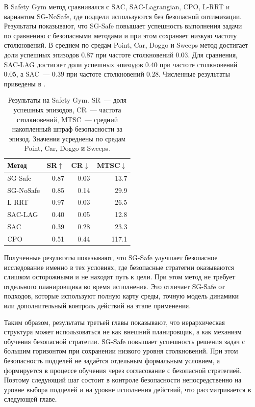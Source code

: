 В Safety Gym метод сравнивался с SAC, SAC-Lagrangian, CPO, L-RRT и вариантом SG-NoSafe, где подцели используются без безопасной оптимизации. Результаты показывают, что SG-Safe повышает успешность выполнения задачи по сравнению с безопасными методами и при этом сохраняет низкую частоту столкновений. В среднем по средам Point, Car, Doggo и Sweeps метод достигает доли успешных эпизодов $0.87$ при частоте столкновений $0.03$. Для сравнения, SAC-LAG достигает доли успешных эпизодов $0.40$ при частоте столкновений $0.05$, а SAC~--- $0.39$ при частоте столкновений $0.28$. Численные результаты приведены в .

\begin{table}[ht]
\centering
\caption{Результаты на Safety Gym. SR~--- доля успешных эпизодов, CR~--- частота столкновений, MTSC~--- средний накопленный штраф безопасности за эпизод. Значения усреднены по средам Point, Car, Doggo и Sweeps.}
\label{tab:synopsis_sgsafe_sg}
\normalsize
\setlength{\tabcolsep}{4pt}
\renewcommand{\arraystretch}{1.0}
\begin{tabular}{@{}lrrr@{}}
\toprule
Метод & SR$\uparrow$ & CR$\downarrow$ & MTSC$\downarrow$ \\
\midrule
SG-Safe & 0.87 & 0.03 & 13.7 \\
SG-NoSafe & 0.85 & 0.14 & 29.9 \\
L-RRT & 0.97 & 0.03 & 26.5 \\
SAC-LAG & 0.40 & 0.05 & 12.8 \\
SAC & 0.39 & 0.28 & 23.3 \\
CPO & 0.51 & 0.44 & 117.1 \\
\bottomrule
\end{tabular}
\end{table}

Полученные результаты показывают, что SG-Safe улучшает безопасное исследование именно в тех условиях, где безопасные стратегии оказываются слишком осторожными и не находят путь к цели. При этом метод не требует отдельного планировщика во время исполнения. Это отличает SG-Safe от подходов, которые используют полную карту среды, точную модель динамики или дополнительный контроль действий на этапе применения.

Таким образом, результаты третьей главы показывают, что иерархическая структура может использоваться не как внешний планировщик, а как механизм обучения безопасной стратегии. SG-Safe повышает успешность решения задач с большим горизонтом при сохранении низкого уровня столкновений. При этом безопасность подцелей не задаётся отдельным формальным условием, а формируется в процессе обучения через согласование с безопасной стратегией. Поэтому следующий шаг состоит в контроле безопасности непосредственно на уровне выбора подцелей и на уровне исполнения действий, что рассматривается в следующей главе.

